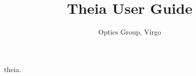 \documentclass{article}
\title{Theia User Guide}
\author{Optics Group, Virgo}
\begin{document}
theia.
\end{document}
